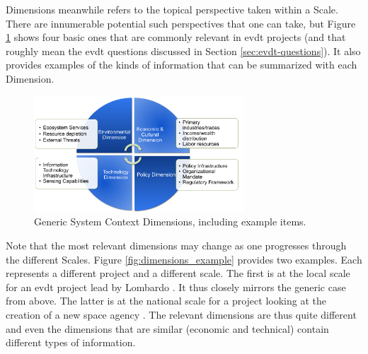 Dimensions meanwhile refers to the topical perspective taken within a Scale. There are innumerable potential such perspectives that one can take, but Figure \ref{fig:dimensions_generic} shows four basic ones that are commonly relevant in \ac{evdt} projects (and that roughly mean the \ac{evdt} questions discussed in Section \ref{sec:evdt-questions}). It also provides examples of the kinds of information that can be summarized with each Dimension.

\begin{figure}[!htb] 
\centering
\includegraphics[width=0.7\textwidth]{Figures/chap3/dimensions_generic.png}
\caption[Generic System Context Dimensions]{Generic System Context Dimensions, including example items.}
\label{fig:dimensions_generic}
\end{figure}

Note that the most relevant dimensions may change as one progresses through the different Scales. Figure \ref{fig:dimensions_example} provides two examples. Each represents a different project and a different scale. The first is at the local scale for an \ac{evdt} project lead by Lombardo \cite{lombardoDevelopmentDecisionSupport2021, lombardoUtilizingSatelliteEarth2022}. It thus closely mirrors the generic case from above. The latter is at the national scale for a project looking at the creation of a new space agency \cite{woodBuildingTechnologicalCapability2012}. The relevant dimensions are thus quite different and even the dimensions that are similar (economic and technical) contain different types of information.

